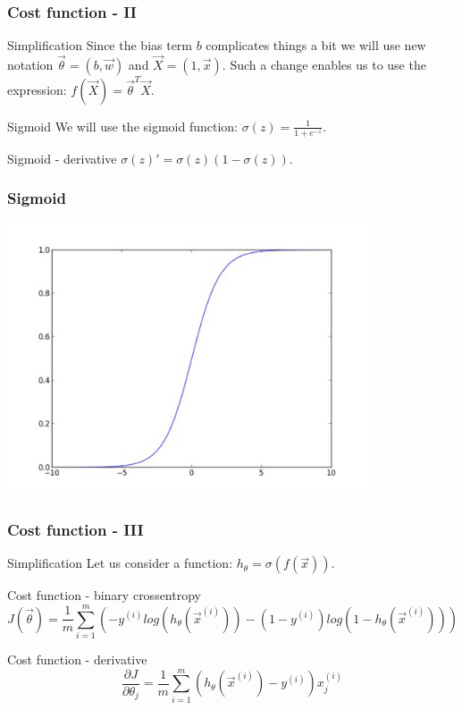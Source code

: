 \documentclass{beamer}
\begin{document}
\begin{frame}
\frametitle{Cost function - II}
\begin{block}{Simplification}
Since the bias term $b$ complicates things a bit we will use new notation $\vec{\theta} = (b, \vec{w})$ and $\vec{X} = (1, \vec{x})$. Such a change enables us to use the expression: $f(\vec{X}) = \vec{\theta}^T \vec{X}$.
\end{block}

\begin{block}{Sigmoid}
We will use the sigmoid function: $\sigma(z) = \frac{1}{1+e^{-z}}$.
\end{block}

\begin{block}{Sigmoid - derivative}
$\sigma(z)' = \sigma(z) (1 - \sigma(z))$.
\end{block}
\end{frame}


\begin{frame}
\frametitle{Sigmoid}
\center
\includegraphics[width=0.8\textwidth]{sigmoid.png}
\end{frame}



\begin{frame}
\frametitle{Cost function - III}
\begin{block}{Simplification}
Let us consider a function: $h_{\theta} = \sigma(f(\vec{x}))$.
\end{block}

\begin{block}{Cost function - binary crossentropy}
\begin{equation*}
J(\vec{\theta}) = \frac{1}{m} \sum_{i=1}^m \left( -y^{(i)} log(h_{\theta}(\vec{x}^{(i)})) - (1 - y^{(i)}) log(1 - h_{\theta} (\vec{x}^{(i)})) \right)
\end{equation*}
\end{block}

\begin{block}{Cost function - derivative}
\begin{equation*}
\frac{\partial J}{\partial \theta_j} = \frac{1}{m} \sum_{i=1}^m \left( h_{\theta}(\vec{x}^{(i)}) - y^{(i)} \right) x_j^{(i)}
\end{equation*}
\end{block}
\end{frame}
\end{document}
